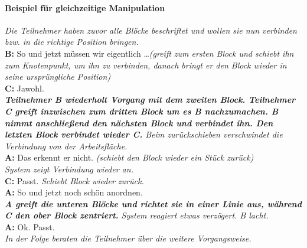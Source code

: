 \paragraph{Beispiel für gleichzeitige Manipulation} %
\begin{transkript}
	\emph{Die Teilnehmer haben zuvor alle Blöcke beschriftet und wollen sie nun verbinden bzw. in die richtige Position bringen.} \\
	\textbf{B:} So und jetzt müssen wir eigentlich \ldots \emph{(greift zum ersten Block und schiebt ihn zum Knotenpunkt, um ihn zu verbinden, danach bringt er den Block wieder in seine ursprüngliche Position)} \\
	\textbf{C:} Jawohl. \\
	\emph{\textbf{Teilnehmer B wiederholt Vorgang mit dem zweiten Block. Teilnehmer C greift inzwischen zum dritten Block um es B nachzumachen. B nimmt anschließend den nächsten Block und verbindet ihn. Den letzten Block verbindet wieder C.} Beim zurückschieben verschwindet die Verbindung von der Arbeitsfläche.} \\
	\textbf{A:} Das erkennt er nicht. \emph{(schiebt den Block wieder ein Stück zurück)} \\
	\emph{System zeigt Verbindung wieder an.} \\
	\textbf{C:} Passt. \emph{Schiebt Block wieder zurück.} \\
	\textbf{A:} So und jetzt noch schön anordnen. \\
	\emph{\textbf{A greift die unteren Blöcke und richtet sie in einer Linie aus, während C den ober Block zentriert.} System reagiert etwas verzögert. B lacht.} \\
	\textbf{A:} Ok. Passt. \\
	\emph{In der Folge beraten die Teilnehmer über die weitere Vorgangsweise.} \\
\end{transkript}

